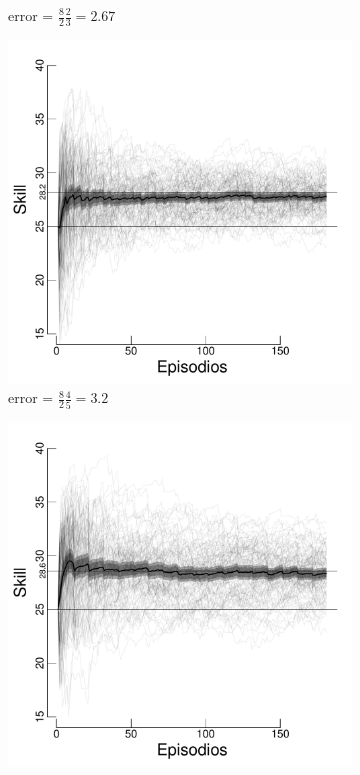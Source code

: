 \documentclass[a4paper,11pt]{book}
\theoremstyle{definition}
\begin{document}
\begin{figure}[H]
\begin{subfigure}[t]{0.32\textwidth}
  \caption{\scriptsize error = $\frac{8}{2}\frac{2}{3} = 2.67$}\label{F4}
  \end{subfigure}
  \begin{subfigure}[t]{0.32\textwidth}
  \includegraphics[page=2,width=\textwidth]{static/truesynergy/expF5.pdf}
  \caption{\scriptsize error = $\frac{8}{2}\frac{4}{5} = 3.2$}\label{F5}
  \end{subfigure}
  \begin{subfigure}[t]{0.32\textwidth}
  \includegraphics[page=1,width=\textwidth]{static/truesynergy/expF6.pdf}

\end{subfigure}
\end{figure}
\end{document}
